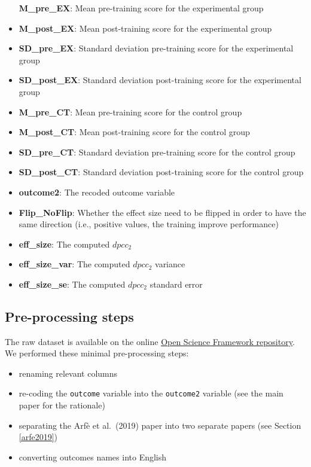 \documentclass[
]{article}
\providecommand{\tightlist}{%
  \setlength{\itemsep}{0pt}\setlength{\parskip}{0pt}}
\begin{document}
\begin{itemize}
  \textbf{M\_pre\_EX}: Mean pre-training score for the experimental group
\item
  \textbf{M\_post\_EX}: Mean post-training score for the experimental group
\item
  \textbf{SD\_pre\_EX}: Standard deviation pre-training score for the experimental group
\item
  \textbf{SD\_post\_EX}: Standard deviation post-training score for the experimental group
\item
  \textbf{M\_pre\_CT}: Mean pre-training score for the control group
\item
  \textbf{M\_post\_CT}: Mean post-training score for the control group
\item
  \textbf{SD\_pre\_CT}: Standard deviation pre-training score for the control group
\item
  \textbf{SD\_post\_CT}: Standard deviation post-training score for the control group
\item
  \textbf{outcome2}: The recoded outcome variable
\item
  \textbf{Flip\_NoFlip}: Whether the effect size need to be flipped in order to have the same direction (i.e., positive values, the training improve performance)
\item
  \textbf{eff\_size}: The computed \(dpcc_2\)
\item
  \textbf{eff\_size\_var}: The computed \(dpcc_2\) variance
\item
  \textbf{eff\_size\_se}: The computed \(dpcc_2\) standard error
\end{itemize}

\hypertarget{pre-processing-steps}{%
\subsection{Pre-processing steps}\label{pre-processing-steps}}

The raw dataset is available on the online \href{https://osf.io/uvbcd/}{Open Science Framework repository}. We performed these minimal pre-processing steps:

\begin{itemize}
\tightlist
\item
  renaming relevant columns
\item
  re-coding the \texttt{outcome} variable into the \texttt{outcome2} variable (see the main paper for the rationale)
\item
  separating the Arfè et al.~(2019) paper into two separate papers (see Section \ref{arfe2019})
\item
  converting outcomes names into English
\end{itemize}
\end{document}
